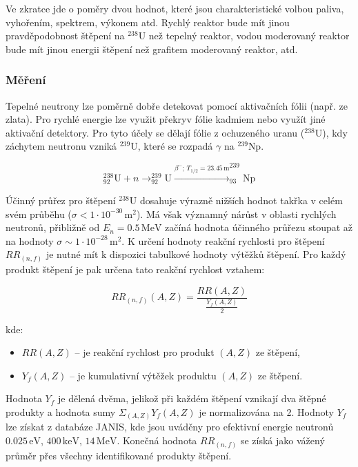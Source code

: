 Ve zkratce jde o poměry dvou hodnot, které jsou charakteristické volbou paliva, vyhořením, spektrem, výkonem atd. Rychlý reaktor bude mít jinou pravděpodobnost štěpení na $^{238}$U než tepelný reaktor, vodou moderovaný reaktor bude mít jinou energii štěpení než grafitem moderovaný reaktor, atd.

\subsubsection{Měření}
Tepelné neutrony lze poměrně dobře detekovat pomocí aktivačních fólii (např. ze zlata). Pro rychlé energie lze využit překryv fólie kadmiem nebo využít jiné aktivační detektory. Pro tyto účely se dělají fólie z ochuzeného uranu ($^{238}$U), kdy záchytem neutronu vzniká $^{239}$U, které se rozpadá $\gamma$ na $^{239}$Np. 

\begin{equation}
    ^{238}_{92}\mathrm{U} + n \longrightarrow ^{239}_{92}\mathrm{U} \xrightarrow{\beta^- ; \, T_{1/2} = 23.45 \, \mathrm{m}} ^{239}_{93}\mathrm{Np}
\end{equation}

Účinný průřez pro štěpení $^{238}\mathrm{U}$ dosahuje výrazně nižších hodnot takřka v celém svém průběhu ($\sigma < 1 \cdot 10^{-30} \, \mathrm{m}^2$). 
Má však významný nárůst v oblasti rychlých neutronů, přibližně od $E_n = 0.5 \, \mathrm{MeV}$ začíná hodnota účinného průřezu stoupat až na hodnoty $\sigma \sim 1 \cdot 10^{-28} \, \mathrm{m}^2$.
K určení hodnoty reakční rychlosti pro štěpení $RR_{(n,f)}$ je nutné mít k dispozici tabulkové hodnoty výtěžků štěpení.
Pro každý produkt štěpení je pak určena tato reakční rychlost vztahem:

\begin{equation}
RR_{(n,f)}(A,Z) = \frac{RR(A,Z)}{\frac{Y_f(A,Z)}{2}} \tag{17.30}
\end{equation}

kde:
\begin{itemize}
    \item $RR(A,Z)$ – je reakční rychlost pro produkt $(A,Z)$ ze štěpení,
    \item $Y_f(A,Z)$ – je kumulativní výtěžek produktu $(A,Z)$ ze štěpení.
\end{itemize}

Hodnota $Y_f$ je dělená dvěma, jelikož při každém štěpení vznikají dva štěpné produkty a hodnota sumy $\Sigma_{(A,Z)} Y_f(A,Z)$ je normalizována na 2.
Hodnoty $Y_f$ lze získat z databáze JANIS, kde jsou uváděny pro efektivní energie neutronů $0.025 \, \mathrm{eV}$, $400 \, \mathrm{keV}$, $14 \, \mathrm{MeV}$.
Konečná hodnota $RR_{(n,f)}$ se získá jako vážený průměr přes všechny identifikované produkty štěpení.

